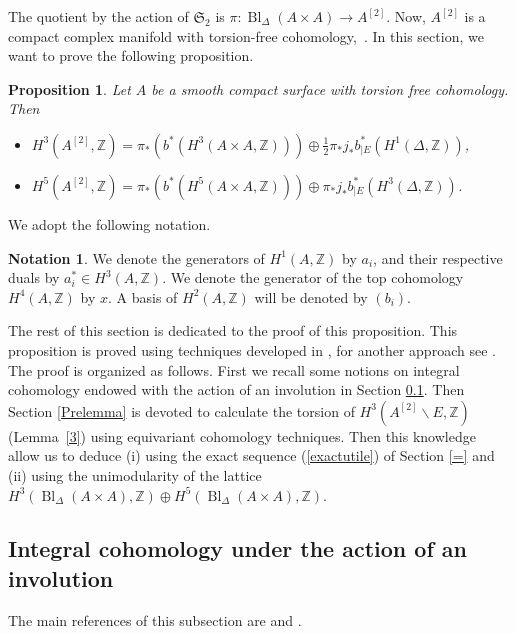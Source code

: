 \documentclass{alggeom}
\DeclareMathOperator{\Bl}{Bl}
\newcommand{\hilb}[1]{^{[#1]}}
\newcommand{\Z}{\mathbb{Z}}
\theoremstyle{plain}
\newtheorem{proposition}[theorem]{Proposition}
\theoremstyle{definition}
\newtheorem{notation}[theorem]{Notation}
\theoremstyle{remark}
\begin{document}
The quotient by the action of $\mathfrak{S}_2$ is 
$ \pi:\Bl_\Delta(A\! \times\! A)\rightarrow A\hilb{2}$.
Now, $A\hilb{2}$ is a compact complex manifold with torsion-free cohomology,~\cite[Theorem~2.2]{Totaro}.
In this section, we want to prove the following proposition.
\begin{proposition} \label{Alpha35}
Let $A$ be a smooth compact surface with torsion free cohomology.
Then
\begin{itemize}
\item[(i)]
$H^{3}(A\hilb{2},\Z)=\pi_*(b^{*}(H^{3}(A\times A,\Z)))\oplus \frac{1}{2}\pi_*j_*b_{|E}^{*}(H^1(\Delta,\Z))$,
\item[(ii)]
$H^{5}(A\hilb{2},\Z)=\pi_*(b^{*}(H^{5}(A\times A,\Z)))\oplus \pi_*j_*b_{|E}^{*}(H^3(\Delta,\Z))$.
\end{itemize}
\end{proposition}
We adopt the following notation.
\begin{notation} \label{TorusClasses}
We denote the generators of $H^1(A,\Z)$ by $a_i$, and their respective duals by $a_i^*\in H^3(A,\Z)$. 
We denote the generator of the top cohomology $H^4(A,\Z)$ by $x$.
A basis of $H^2(A,\Z)$ will be denoted by $(b_i)$.
\end{notation}
The rest of this section is dedicated to the proof of this proposition. 
This proposition is proved using techniques developed in \cite{Lol}, for another approach see \cite{Totaro}.
The proof is organized as follows. First we recall some notions on integral cohomology endowed with the action of an involution in Section \ref{IntegralTools}. 
Then Section \ref{Prelemma} is devoted to calculate the torsion of $H^{3}(A\hilb{2}\smallsetminus E,\Z)$ (Lemma~\ref{3}) using equivariant cohomology techniques. Then this knowledge allow us to deduce (i) using the exact sequence (\ref{exactutile}) of Section \ref{=} and (ii) using the unimodularity of the lattice $H^{3}\left(\Bl_\Delta(A\! \times\! A),\Z\right)\oplus H^{5}\left(\Bl_\Delta(A\! \times\! A),\Z\right)$.
\subsection{Integral cohomology under the action of an involution}\label{IntegralTools}
The main references of this subsection are \cite{Lol} and \cite{BNS}.
\end{document}
